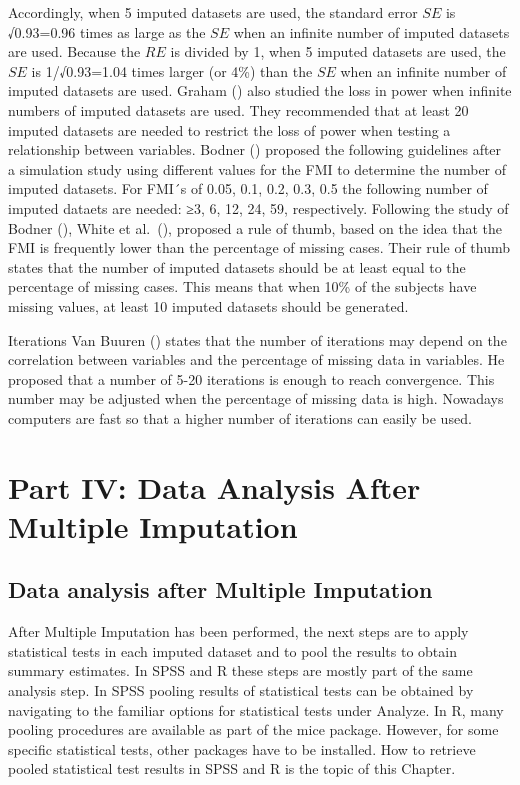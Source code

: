\documentclass[
]{book}
\begin{document}
Accordingly, when 5 imputed datasets are used, the standard error \(SE\) is √0.93=0.96 times as large as the \(SE\) when an infinite number of imputed datasets are used. Because the \(RE\) is divided by 1, when 5 imputed datasets are used, the \(SE\) is 1/√0.93=1.04 times larger (or 4\%) than the \(SE\) when an infinite number of imputed datasets are used. Graham (\citet{Graham2007}) also studied the loss in power when infinite numbers of imputed datasets are used. They recommended that at least 20 imputed datasets are needed to restrict the loss of power when testing a relationship between variables. Bodner (\citet{Bodner2008}) proposed the following guidelines after a simulation study using different values for the FMI to determine the number of imputed datasets. For FMI´s of 0.05, 0.1, 0.2, 0.3, 0.5 the following number of imputed dataets are needed: ≥3, 6, 12, 24, 59, respectively. Following the study of Bodner (\citet{Bodner2008}), White et al.~(\citet{White2011}), proposed a rule of thumb, based on the idea that the FMI is frequently lower than the percentage of missing cases. Their rule of thumb states that the number of imputed datasets should be at least equal to the percentage of missing cases. This means that when 10\% of the subjects have missing values, at least 10 imputed datasets should be generated.

Iterations
Van Buuren (\citet{VanBuuren2018}) states that the number of iterations may depend on the correlation between variables and the percentage of missing data in variables. He proposed that a number of 5-20 iterations is enough to reach convergence. This number may be adjusted when the percentage of missing data is high. Nowadays computers are fast so that a higher number of iterations can easily be used.

\hypertarget{part-part-iv-data-analysis-after-multiple-imputation}{%
\part{Part IV: Data Analysis After Multiple Imputation}\label{part-part-iv-data-analysis-after-multiple-imputation}}

\hypertarget{data-analysis-after-multiple-imputation}{%
\chapter{Data analysis after Multiple Imputation}\label{data-analysis-after-multiple-imputation}}

After Multiple Imputation has been performed, the next steps are to apply statistical tests in each imputed dataset and to pool the results to obtain summary estimates. In SPSS and R these steps are mostly part of the same analysis step. In SPSS pooling results of statistical tests can be obtained by navigating to the familiar options for statistical tests under Analyze. In R, many pooling procedures are available as part of the mice package. However, for some specific statistical tests, other packages have to be installed. How to retrieve pooled statistical test results in SPSS and R is the topic of this Chapter.
\end{document}
